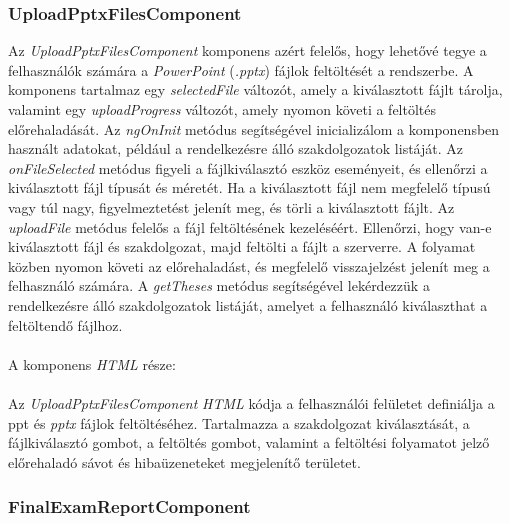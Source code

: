 \subsubsection{UploadPptxFilesComponent}

Az \textit{UploadPptxFilesComponent} komponens azért felelős, hogy lehetővé tegye a felhasználók számára a \textit{PowerPoint} (\textit{.pptx}) fájlok feltöltését a rendszerbe. A komponens tartalmaz egy \textit{selectedFile} változót, amely a kiválasztott fájlt tárolja, valamint egy \textit{uploadProgress} változót, amely nyomon követi a feltöltés előrehaladását. Az \textit{ngOnInit} metódus segítségével inicializálom a komponensben használt adatokat, például a rendelkezésre álló szakdolgozatok listáját. Az \textit{onFileSelected} metódus figyeli a fájlkiválasztó eszköz eseményeit, és ellenőrzi a kiválasztott fájl típusát és méretét. Ha a kiválasztott fájl nem megfelelő típusú vagy túl nagy, figyelmeztetést jelenít meg, és törli a kiválasztott fájlt. Az \textit{uploadFile} metódus felelős a fájl feltöltésének kezeléséért. Ellenőrzi, hogy van-e kiválasztott fájl és szakdolgozat, majd feltölti a fájlt a szerverre. A folyamat közben nyomon követi az előrehaladást, és megfelelő visszajelzést jelenít meg a felhasználó számára. A \textit{getTheses} metódus segítségével lekérdezzük a rendelkezésre álló szakdolgozatok listáját, amelyet a felhasználó kiválaszthat a feltöltendő fájlhoz.
\\
\\
A komponens \textit{HTML} része:\\
\\
Az \textit{UploadPptxFilesComponent} \textit{HTML} kódja a felhasználói felületet definiálja a ppt és \textit{pptx} fájlok feltöltéséhez. Tartalmazza a szakdolgozat kiválasztását, a fájlkiválasztó gombot, a feltöltés gombot, valamint a feltöltési folyamatot jelző előrehaladó sávot és hibaüzeneteket megjelenítő területet.


\subsubsection{FinalExamReportComponent}

